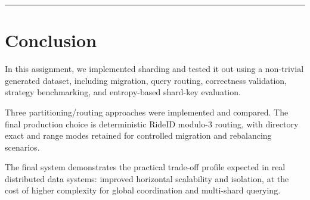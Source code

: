 \documentclass[12pt]{article}
\begin{document}
\hrule
\vspace{0.75em}

\section{Conclusion}

In this assignment, we implemented sharding and tested it out using a non-trivial generated dataset, including migration, query routing, correctness validation, strategy benchmarking, and entropy-based shard-key evaluation.

Three partitioning/routing approaches were implemented and compared. The final production choice is deterministic RideID modulo-3 routing, with directory exact and range modes retained for controlled migration and rebalancing scenarios.

The final system demonstrates the practical trade-off profile expected in real distributed data systems: improved horizontal scalability and isolation, at the cost of higher complexity for global coordination and multi-shard querying.
\end{document}

